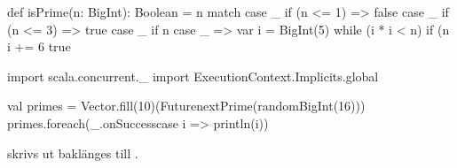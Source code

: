 \ExtraTasks %

\Task  %

\begin{Code}
def isPrime(n: BigInt): Boolean = n match {
  case _ if (n <= 1) => false
  case _ if (n <= 3) => true
  case _ if n %
  case _ => 
    var i = BigInt(5)
    while (i * i < n) {
      if (n %
      i += 6
    }
    true
}

import scala.concurrent._
import ExecutionContext.Implicits.global

val primes = Vector.fill(10)(Future{nextPrime(randomBigInt(16))})
primes.foreach(_.onSuccess{case i => println(i)})
\end{Code}

\Task %

\Subtask

\Subtask

\Subtask

\Subtask

\Subtask

\Subtask

\Task %

\AdvancedTasks %

\Task %

\Subtask {} skrivs ut baklänges till .

\Subtask

\Subtask

\Subtask

\Subtask

\Subtask

\Subtask

\Subtask

\Subtask

\Task %

\Task %

\Task %

\Task %

\Subtask

\Subtask

\Subtask

\Task %

\Subtask

\Subtask

\Subtask

\Subtask
